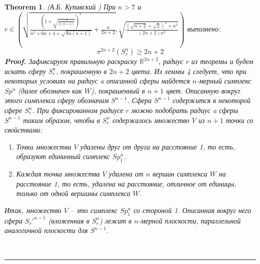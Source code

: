 \documentclass{report}%
\newtheorem{theorem}{Theorem}
\newenvironment{proof}[1][Proof]{\textbf{#1.} }{\ \rule{0.5em}{0.5em}}
\begin{document}
\begin{theorem} (А.Б. Купавский \cite{Kupavsky2011})
		При $n > 7$ и $r \in \left(\sqrt{\frac{\left(1+\sqrt{\frac{n}{2(n+1)}}\right)^2}{n^2+6n+4+\sqrt{8n(n+1)}}+\frac{n}{2n+2}},
													\sqrt{\frac{(\sqrt{n+2} + \sqrt{2})^2+n^3}{(2n+2)n^2}}\right)$ выполнено:
		\begin{equation}
				\pi^{2n+2}(S_r^n) \geq 2n+2
		\end{equation}
		\begin{proof}
				Зафиксируем правильную раскраску $\mathbb{R}^{2n+2}$, радиус $r$ из теоремы и будем искать сферу $S_r^n$,
				покрашенную в $2n+2$ цвета. Из леммы 4 следует,
				что при некоторых условиях на радиус a описанной сферы найдется $n$-мерный симплекс $Sp^n$ (далее обозначен как $W$),
				покрашенный в $n+1$ цвет. Описанную вокруг этого симплекса сферу обозначим $S^{n-1}$.
				Сфера $S^{n-1}$ содержится в некоторой сфере $S_r^n$.
				При фиксированном радиусе $r$ можно подобрать радиус a сферы $S^{n-1}$ таким образом,
				чтобы в $S_r^n$ содержалось множество $V$ из $n + 1$ точки со свойствами:
				\begin{enumerate}
						\item Точки множества $V$ удалены друг от друга на расстояние 1, то есть, образуют единичный симплекс $Sp_1^n$.
						\item Каждая точка множества $V$ удалена от $n$ вершин симплекса $W$ на расстояние 1,
									то есть, удалена на расстояние, отличное от единицы, только от одной вершины симплекса $W$.
				\end{enumerate}
				Итак, множество $V$ – это симплекс $Sp_1^n$ со стороной 1.
				Описанная вокруг него сфера $S_r'^{n-1}$ (вложенная в $S_r^n$) лежит в $n$-мерной плоскости,
				параллельной аналогичной плоскости для $S^{n-1}$.
				

\end{proof}
\end{theorem}
\end{document}

